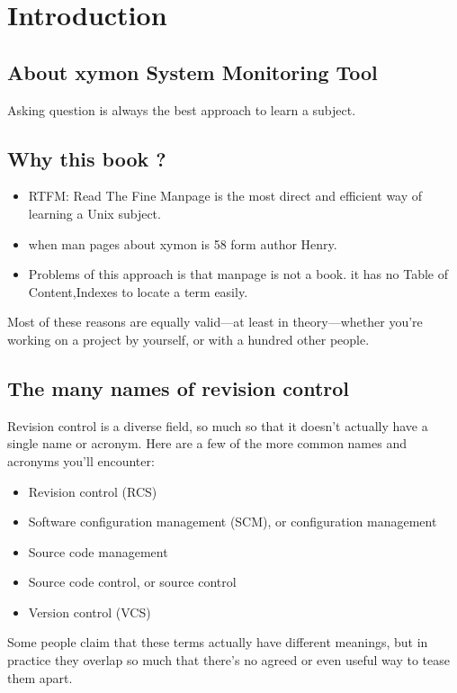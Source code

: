 \chapter{Introduction}
\label{chap:intro}

\section{About xymon System Monitoring Tool}

Asking question is always the best approach to learn a subject.

\section{Why this book ?}

\begin{itemize}
\item RTFM: Read The Fine Manpage is the most direct and efficient way of
learning a Unix subject.
\item  when man pages about xymon is 58 form author Henry.
\item Problems of this approach is that manpage is not a book. it has no
Table of Content,Indexes to locate a term easily.

\end{itemize}

Most of these reasons are equally valid---at least in theory---whether
you're working on a project by yourself, or with a hundred other
people.


\section{The many names of revision control}

Revision control is a diverse field, so much so that it doesn't
actually have a single name or acronym.  Here are a few of the more
common names and acronyms you'll encounter:
\begin{itemize}
\item Revision control (RCS)
\item Software configuration management (SCM), or configuration management
\item Source code management
\item Source code control, or source control
\item Version control (VCS)
\end{itemize}
Some people claim that these terms actually have different meanings,
but in practice they overlap so much that there's no agreed or even
useful way to tease them apart.

